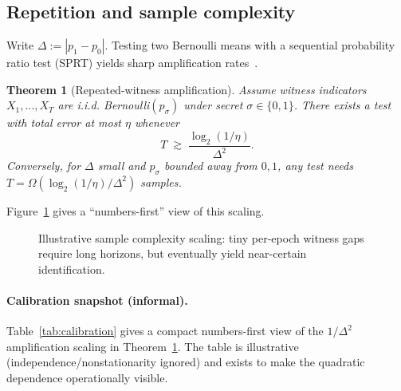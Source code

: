 \documentclass[11pt]{article}
\newtheorem{theorem}{Theorem}
\begin{document}
\subsection{Repetition and sample complexity}
\label{sec:amplification}
Write $\Delta := |p_1-p_0|$.
Testing two Bernoulli means with a sequential probability ratio test (SPRT) yields sharp amplification rates~\cite{wald_sprt_1945,howard2021confseq}.

\begin{theorem}[Repeated-witness amplification]
\label{thm:repeat-witness}
Assume witness indicators $X_1,\dots,X_T$ are i.i.d. Bernoulli$(p_\sigma)$ under secret $\sigma\in\{0,1\}$.
There exists a test with total error at most $\eta$ whenever
\[
T \;\gtrsim\; \frac{\log_2(1/\eta)}{\Delta^2}.
\]
Conversely, for $\Delta$ small and $p_\sigma$ bounded away from $0,1$, any test needs $T=\Omega(\log_2(1/\eta)/\Delta^2)$ samples.
\end{theorem}

Figure~\ref{fig:eps-to-samples} gives a ``numbers-first'' view of this scaling.

\begin{figure}[t]
  \centering
  \caption{Illustrative sample complexity scaling: tiny per-epoch witness gaps require long horizons, but eventually yield near-certain identification.
  }
  \label{fig:eps-to-samples}
\end{figure}

\paragraph{Calibration snapshot (informal).}
Table~\ref{tab:calibration} gives a compact numbers-first view of the $1/\Delta^2$ amplification scaling in Theorem~\ref{thm:repeat-witness}.
The table is illustrative (independence/nonstationarity ignored) and exists to make the quadratic dependence operationally visible.
\end{document}
